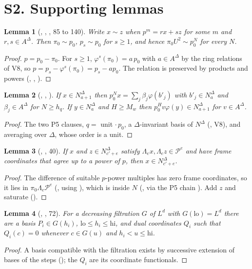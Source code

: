 \documentclass[11pt]{article}
\newcommand{\NN}{N^{\Delta}}
\newcommand{\Pp}{\mathcal P}
\newtheorem{lemma}{Lemma}
\theoremstyle{definition}
\theoremstyle{remark}
\begin{document}
\section{S2. Supporting lemmas}\label{sec:aux}

\begin{lemma}[, , , 85 to 140]\label{lem:crt}
Write $x\sim z$ when $p^m=rx+sz$ for some $m$ and $r,s\in A^\Delta$. Then $\pi_0\sim p_0$, $p_s\sim p_0$ for $s\ge1$, and hence $\pi_0U^2\sim p_0^N$ for every $N$.
\end{lemma}
\begin{proof}
$p=p_0-\pi_0$. For $s\ge1$, $\varphi^s(\pi_0)=a\,p_0$ with $a\in A^\Delta$ by the ring relations of V8, so $p=p_s-\varphi^s(\pi_0)=p_s-ap_0$. The relation is preserved by products and powers (, , ).
\end{proof}

\begin{lemma}[, , ]\label{lem:inv}
If $x\in\NN_{a+1}$ then $p_0^{N}x=\sum_j\beta_j\varphi(b'_j)$ with $b'_j\in\NN_a$ and $\beta_j\in A^\Delta$ for $N\ge h_q$. If $y\in\NN_a$ and $H\ge M_w$ then $p_0^Hv\varphi(y)\in\NN_{a+1}$ for $v\in A^\Delta$.
\end{lemma}
\begin{proof}
The two P5 clauses, $q=$ unit $\cdot\,p_0$, a $\Delta$-invariant basis of $\NN$ (, V8), and averaging over $\Delta$, whose order is a unit.
\end{proof}

\begin{lemma}[, , 40]\label{lem:mse}
If $x$ and $z\in\NN_{c'+e}$ satisfy $\Lambda_ex,\Lambda_ez\in\Pp^e$ and have frame coordinates that agree up to a power of $p$, then $x\in\NN_{c'+e}$.
\end{lemma}
\begin{proof}
The difference of suitable $p$-power multiples has zero frame coordinates, so it lies in $\pi_0\Lambda_e\Pp^e$ (, using ), which is inside $N$ (, via the P5 chain ). Add $z$ and saturate ().
\end{proof}

\begin{lemma}[, , 72]\label{lem:adapted}
For a decreasing filtration $G$ of $L^d$ with $G(\mathrm{lo})=L^d$ there are a basis $P_i\in G(h_i)$, $\mathrm{lo}\le h_i\le\mathrm{hi}$, and dual coordinates $Q_i$ such that $Q_i(c)=0$ whenever $c\in G(u)$ and $h_i<u\le\mathrm{hi}$.
\end{lemma}
\begin{proof}
A basis compatible with the filtration exists by successive extension of bases of the steps (); the $Q_i$ are its coordinate functionals.
\end{proof}
\end{document}
